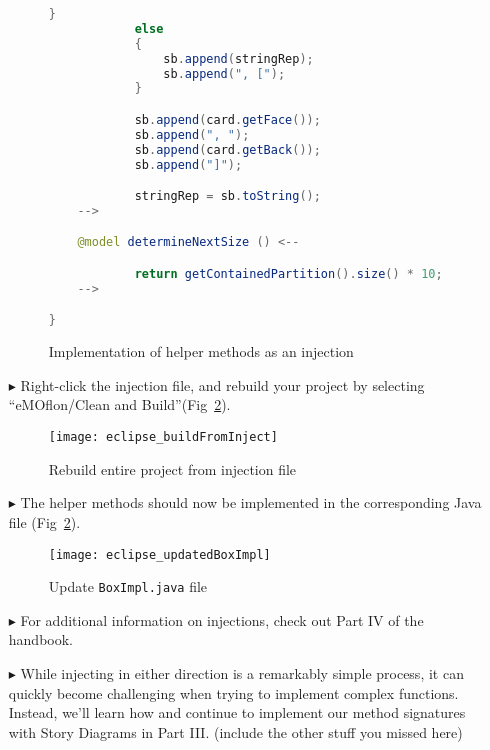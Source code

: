 \begin{itemize}
\begin{figure}[htbp]
\begin{lstlisting}[language=Java]
            }
            else
            {
                sb.append(stringRep);
                sb.append(", [");
            }

            sb.append(card.getFace());
            sb.append(", ");
            sb.append(card.getBack());
            sb.append("]");

            stringRep = sb.toString();
    -->

    @model determineNextSize () <--

            return getContainedPartition().size() * 10;
    -->

}
        \end{lstlisting}
        \caption{Implementation of helper methods as an injection}
        \label{code:complete_inject_file}
    \end{figure}
    \FloatBarrier

\item[$\blacktriangleright$] Right-click the injection file, and rebuild your project by selecting ``eMOflon/Clean and
Build''(Fig~\ref{fig:eclipse_buildFromInjecton}).

\vspace{0.5cm}

\begin{figure}[htbp]
    \centering
    \texttt{[image: eclipse\_buildFromInject]}
    \caption{Rebuild entire project from injection file}
    \label{fig:eclipse_buildFromInjecton}
\end{figure}

\vspace{0.5cm}

\item[$\blacktriangleright$] The helper methods should now be implemented in the corresponding Java file (Fig~\ref{fig:eclipse_buildFromInjecton}).

\clearpage

\begin{figure}[htbp]
    \centering
    \texttt{[image: eclipse\_updatedBoxImpl]}
    \caption{Update \texttt{BoxImpl.java} file}
    \label{fig:eclipse_updatedBoxImpl}
\end{figure}

\vspace{0.5cm}

\item[$\blacktriangleright$] For additional information on injections, check out Part IV of the handbook.

\vspace{0.5cm}

\item[$\blacktriangleright$] While injecting in either direction is a remarkably simple process, it can quickly become challenging when trying to implement
complex functions. Instead, we'll learn how and continue to implement our method signatures with Story Diagrams in Part III. (include the other stuff you missed
here)

 
\end{itemize}
